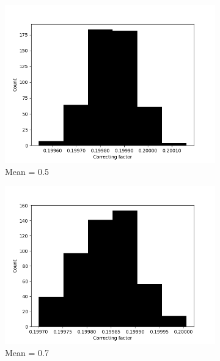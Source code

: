 \begin{figure}
\begin{subfigure}[t]{0.45\textwidth}
        \centering
        \includegraphics[width=1\textwidth]{./images/robust_approx/results_2d_high_rank_figures/correcting_factors_hadamard_std_10_05.png}
        \caption{Mean = 0.5}
      \end{subfigure}
      \begin{subfigure}[t]{0.45\textwidth}
        \centering
        \includegraphics[width=1\textwidth]{./images/robust_approx/results_2d_high_rank_figures/correcting_factors_hadamard_std_10_07.png}
        \caption{Mean = 0.7}
      \end{subfigure}
      \begin{subfigure}[t]{0.45\textwidth}
        \centering

\end{subfigure}
\end{figure}

